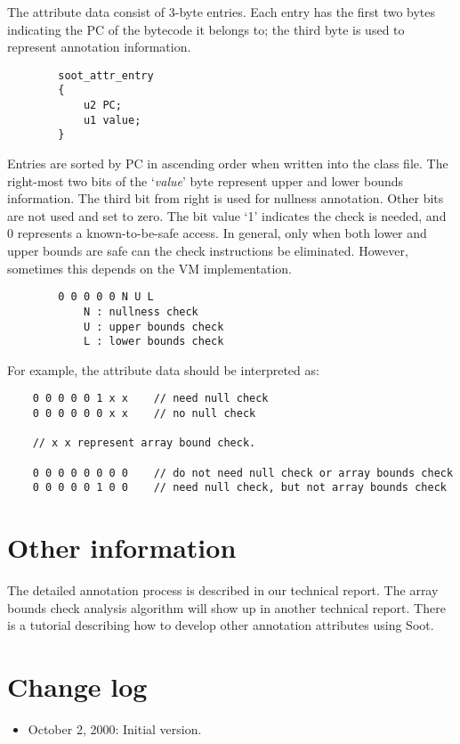 \documentclass{article}
\begin{document}
The attribute data consist of 3-byte entries. Each entry has the first two 
bytes indicating the PC of the bytecode it belongs to; the third byte is 
used to represent annotation information.

\begin{verbatim}
        soot_attr_entry
        {
            u2 PC;
            u1 value;
        }
\end{verbatim}

Entries are sorted by PC in ascending order when written into the class
file. The right-most two bits of the `{\em value}' byte represent
upper and lower bounds information. The third bit from right is used
for nullness annotation.  Other bits are not used and set to zero. The
bit value `1' indicates the check is needed, and 0 represents a
known-to-be-safe access. In general, only when both lower and upper
bounds are safe can the check instructions be eliminated. However,
sometimes this depends on the VM implementation.

\begin{verbatim}
        0 0 0 0 0 N U L
            N : nullness check
            U : upper bounds check
            L : lower bounds check  
\end{verbatim}

For example, the attribute data should be interpreted as:
\begin{verbatim}
    0 0 0 0 0 1 x x    // need null check
    0 0 0 0 0 0 x x    // no null check

    // x x represent array bound check.

    0 0 0 0 0 0 0 0    // do not need null check or array bounds check
    0 0 0 0 0 1 0 0    // need null check, but not array bounds check
\end{verbatim}

          
\section*{Other information}
The detailed annotation process is described in our technical report. 
The array bounds check analysis algorithm will show up in another 
technical report. There is a tutorial describing how to develop
other annotation attributes using Soot.

\section*{Change log}
\begin{itemize}
\item October 2, 2000: Initial version.
\end{itemize}
\end{document}
